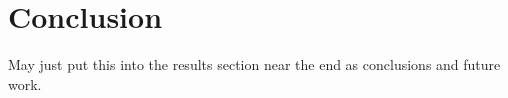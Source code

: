 \chapter{Conclusion}

May just put this into the results section near the end as conclusions and future work.